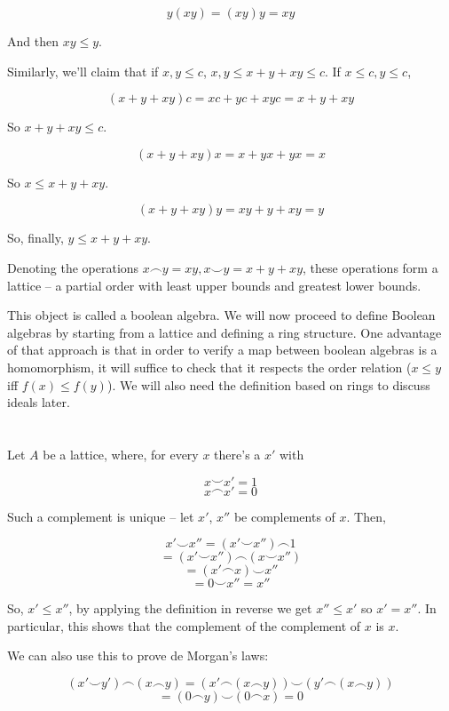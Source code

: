\documentclass{article}
\begin{document}
    \[ y(xy) = (xy)y = xy\]

    And then $xy \leq y$.

    Similarly, we'll claim that if $x,y \leq c$, $x,y \leq x + y + xy \leq c$.
    If $x \leq c, y \leq c$,

    \[(x + y + xy)c = xc + yc + xyc = x + y + xy\]

    So $x + y + xy \leq c$.

    \[(x + y + xy)x = x + yx + yx = x\]

    So $x \leq x + y + xy$.

    \[(x + y + xy)y = xy + y + xy = y\]

    So, finally, $y \leq x + y + xy$.

    Denoting the operations $x \frown y = xy, x \smile y = x + y + xy$, these
    operations form a lattice -- a partial order with least upper bounds and greatest
    lower bounds.

    This object is called a boolean algebra. We will now proceed to define
    Boolean algebras by starting from a lattice and defining a ring structure.
    One advantage of that approach is that in order to verify a map between
    boolean algebras is a homomorphism, it will suffice to check that it
    respects the order relation ($x \leq y$ iff $f(x) \leq f(y)$). We will also
    need the definition based on rings to discuss ideals later.

    \section{}

    Let $A$ be a lattice, where, for every  $x$ there's a $x'$ with

    \[x \smile x' = 1\]
    \[x \frown x' = 0\]

    Such a complement is unique -- let $x'$, $x''$ be complements of $x$. Then,

    \[x' \smile x'' = (x' \smile  x'') \frown 1\]
    \[= (x' \smile  x'') \frown (x \smile x'')\]
    \[= (x' \frown x) \smile x''\]
    \[= 0 \smile x'' = x''\]

    So, $x' \leq x''$, by applying the definition in reverse we get $x'' \leq
    x'$ so $x' = x''$. In particular, this shows that the complement of the
    complement of $x$ is $x$.

    We can also use this to prove de Morgan's laws:

    \[(x' \smile y') \frown (x \frown y) = (x' \frown (x \frown y)) \smile (y'
    \frown (x \frown y))\]
    \[ = (0 \frown y) \smile (0 \frown x) = 0\]
\end{document}
